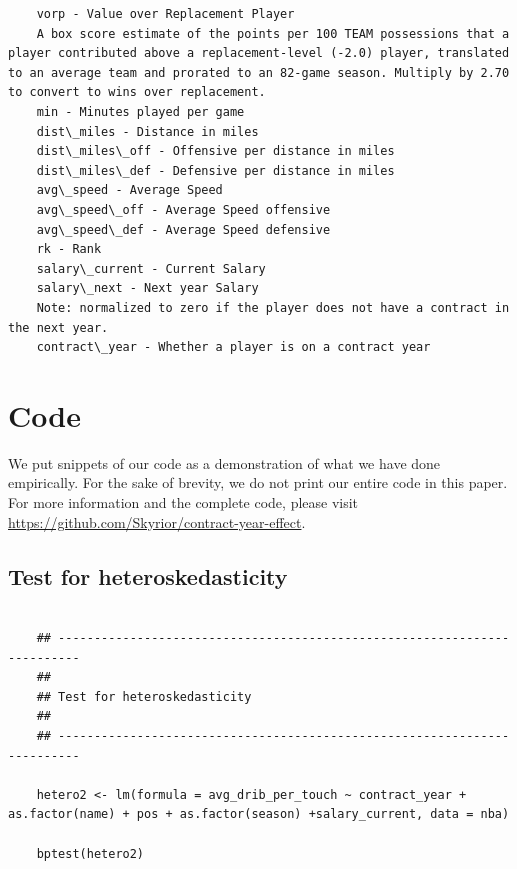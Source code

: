 \documentclass[12pt]{article}
\begin{document}
\begin{lstlisting}
	vorp - Value over Replacement Player
	A box score estimate of the points per 100 TEAM possessions that a player contributed above a replacement-level (-2.0) player, translated to an average team and prorated to an 82-game season. Multiply by 2.70 to convert to wins over replacement.
	min - Minutes played per game
	dist\_miles - Distance in miles
	dist\_miles\_off - Offensive per distance in miles
	dist\_miles\_def - Defensive per distance in miles
	avg\_speed - Average Speed
	avg\_speed\_off - Average Speed offensive
	avg\_speed\_def - Average Speed defensive
	rk - Rank
	salary\_current - Current Salary
	salary\_next - Next year Salary
	Note: normalized to zero if the player does not have a contract in the next year.
	contract\_year - Whether a player is on a contract year
	\end{lstlisting}
	
	
	\clearpage
	
	\section{Code} \label{sec:code}
	
	
	We put snippets of our code as a demonstration of what we have done empirically. For the sake of brevity, we do not print our entire code in this paper. For more information and the complete code, please visit \url{https://github.com/Skyrior/contract-year-effect}.
	
	\subsection{Test for heteroskedasticity}
	
	\begin{lstlisting}
	
	## -------------------------------------------------------------------------
	##
	## Test for heteroskedasticity
	##
	## -------------------------------------------------------------------------
	
	hetero2 <- lm(formula = avg_drib_per_touch ~ contract_year + as.factor(name) + pos + as.factor(season) +salary_current, data = nba)
	
	bptest(hetero2)
	
	\end{lstlisting}
	
\end{document}
